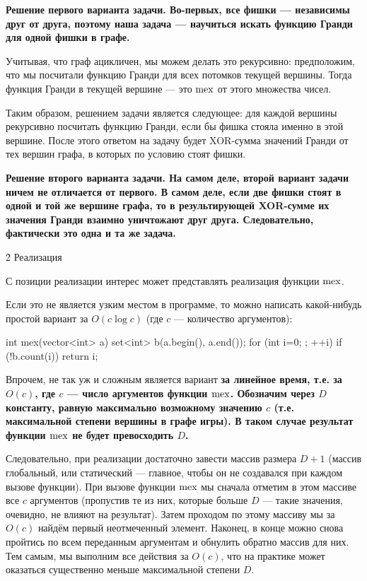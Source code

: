 \bf{Решение первого варианта задачи}. Во-первых, все фишки --- независимы друг от друга, поэтому наша задача --- научиться искать функцию Гранди для одной фишки в графе.

Учитывая, что граф ацикличен, мы можем делать это рекурсивно: предположим, что мы посчитали функцию Гранди для всех потомков текущей вершины. Тогда функция Гранди в текущей вершине --- это $\rm mex$ от этого множества чисел.

Таким образом, решением задачи является следующее: для каждой вершины рекурсивно посчитать функцию Гранди, если бы фишка стояла именно в этой вершине. После этого ответом на задачу будет XOR-сумма значений Гранди от тех вершин графа, в которых по условию стоят фишки.

\bf{Решение второго варианта задачи}. На самом деле, второй вариант задачи ничем не отличается от первого. В самом деле, если две фишки стоят в одной и той же вершине графа, то в результирующей XOR-сумме их значения Гранди взаимно уничтожают друг друга. Следовательно, фактически это одна и та же задача.


\h2{ Реализация }

С позиции реализации интерес может представлять реализация функции $\rm mex$.

Если это не является узким местом в программе, то можно написать какой-нибудь простой вариант за $O (c \log c)$ (где $c$ --- количество аргументов):

\code
int mex(vector<int> a) {
	set<int> b(a.begin(), a.end());
	for (int i=0; ; ++i)
		if (!b.count(i))
			return i;
}
\endcode

Впрочем, не так уж и сложным является вариант \bf{за линейное время}, т.е. за $O (c)$, где $c$ --- число аргументов функции $\rm mex$. Обозначим через $D$ константу, равную максимально возможному значению $c$ (т.е. максимальной степени вершины в графе игры). В таком случае результат функции $\rm mex$ не будет превосходить $D$.

Следовательно, при реализации достаточно завести массив размера $D+1$ (массив глобальный, или статический --- главное, чтобы он не создавался при каждом вызове функции). При вызове функции $\rm mex$ мы сначала отметим в этом массиве все $c$ аргументов (пропустив те из них, которые больше $D$ --- такие значения, очевидно, не влияют на результат). Затем проходом по этому массиву мы за $O (c)$ найдём первый неотмеченный элемент. Наконец, в конце можно снова пройтись по всем переданным аргументам и обнулить обратно массив для них. Тем самым, мы выполним все действия за $O (c)$, что на практике может оказаться существенно меньше максимальной степени $D$.


